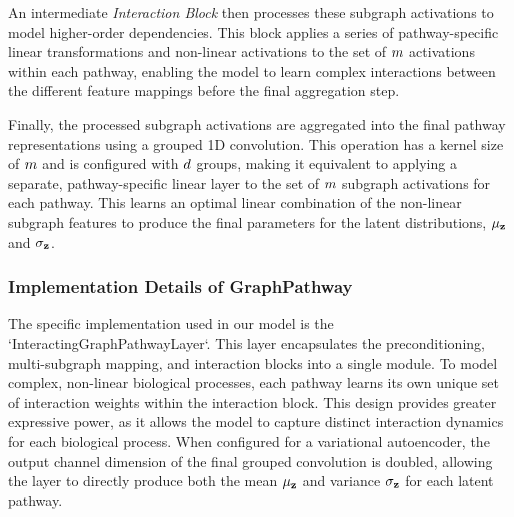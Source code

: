 An intermediate \emph{Interaction Block} then processes these subgraph activations to model higher-order dependencies.
This block applies a series of pathway-specific linear transformations and non-linear activations to the set of $m$ activations within each pathway, enabling the model to learn complex interactions between the different feature mappings before the final aggregation step.

Finally, the processed subgraph activations are aggregated into the final pathway representations using a grouped 1D convolution.
This operation has a kernel size of $m$ and is configured with $d$ groups, making it equivalent to applying a separate, pathway-specific linear layer to the set of $m$ subgraph activations for each pathway.
This learns an optimal linear combination of the non-linear subgraph features to produce the final parameters for the latent distributions, $\vect{\mu}_{\latentvars}$ and $\vect{\sigma}_{\latentvars}$.

\subsubsection{Implementation Details of GraphPathway}
\label{app:graphpathway:implementation}

The specific implementation used in our model is the `InteractingGraphPathwayLayer`.
This layer encapsulates the preconditioning, multi-subgraph mapping, and interaction blocks into a single module.
To model complex, non-linear biological processes, each pathway learns its own unique set of interaction weights within the interaction block.
This design provides greater expressive power, as it allows the model to capture distinct interaction dynamics for each biological process.
When configured for a variational autoencoder, the output channel dimension of the final grouped convolution is doubled, allowing the layer to directly produce both the mean $\vect{\mu}_{\latentvars}$ and variance $\vect{\sigma}_{\latentvars}$ for each latent pathway.

